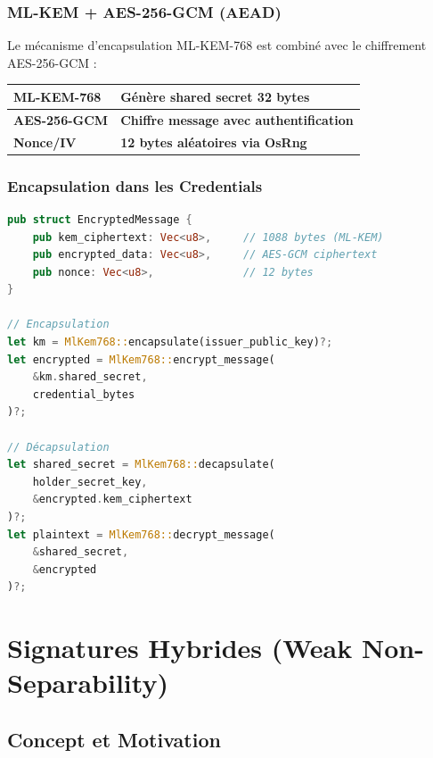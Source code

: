 \documentclass[12pt,a4paper]{report}
\begin{document}
\subsection{ML-KEM + AES-256-GCM (AEAD)}

Le mécanisme d'encapsulation ML-KEM-768 est combiné avec le chiffrement AES-256-GCM :

\begin{table}[H]
\centering
\begin{tabular}{|l|l|}
\hline
\textbf{ML-KEM-768} & \textbf{Génère shared secret 32 bytes} \\
\hline
\textbf{AES-256-GCM} & \textbf{Chiffre message avec authentification} \\
\hline
\textbf{Nonce/IV} & \textbf{12 bytes aléatoires via OsRng} \\
\hline
\end{tabular}
\end{table}

\subsection{Encapsulation dans les Credentials}

\begin{lstlisting}[language=Rust]
pub struct EncryptedMessage {
    pub kem_ciphertext: Vec<u8>,     // 1088 bytes (ML-KEM)
    pub encrypted_data: Vec<u8>,     // AES-GCM ciphertext
    pub nonce: Vec<u8>,              // 12 bytes
}

// Encapsulation
let km = MlKem768::encapsulate(issuer_public_key)?;
let encrypted = MlKem768::encrypt_message(
    &km.shared_secret,
    credential_bytes
)?;

// Décapsulation
let shared_secret = MlKem768::decapsulate(
    holder_secret_key,
    &encrypted.kem_ciphertext
)?;
let plaintext = MlKem768::decrypt_message(
    &shared_secret,
    &encrypted
)?;
\end{lstlisting}

\chapter{Signatures Hybrides (Weak Non-Separability)}

\section{Concept et Motivation}
\end{document}

